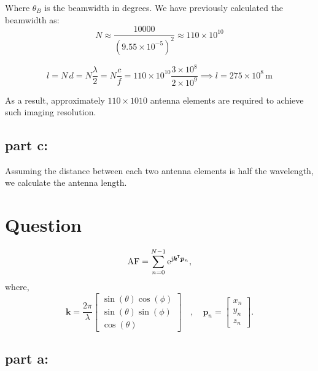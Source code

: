 \documentclass[12pt,onecolumn,a4paper]{article}
\newcommand*{\transpose}{{\mkern-1.5mu\mathsf{T}}}
\newcommand\question{
	\section{Question \numberstringnum{\thesection}}
}
\begin{document}
	Where $\theta_B$ is the beamwidth in degrees. We have previously calculated the beamwidth as:
	\begin{equation}
		N \approx \frac{10000}{(9.55 \times 10^{-5})^2} \approx 110 \times 10^{10}
	\end{equation}
	
	
	\begin{equation}
		l = N \, d = N \frac{\lambda}{2} = N \frac{c}{f} = 110 \times 10^{10} \frac{3 \times 10^8}{2 \times 10^9} \implies l = 275 \times 10^8 \, \text{m}
	\end{equation}
	
	
	As a result, approximately $110 \times 1010$ antenna elements are required to achieve such imaging resolution.
	
	
	\FloatBarrier
	\subsection{part c:}

 Assuming the distance between each two antenna elements is half the wavelength, we calculate the antenna length.
	
	
	
	
	
	
	
	
	\FloatBarrier
	\question%
	
	
	\begin{equation}
		\text{AF} = \sum_{n=0}^{N-1} \mathrm{e}^{\mathrm{j}\bm{k}^\transpose\bm{p}_n},
	\end{equation}
	where,
	\begin{equation}
		\bm{k} =
		\frac{2\pi}{\lambda}
		\begin{bmatrix}
			\sin(\theta)\cos(\phi) \\ 	\sin(\theta)\sin(\phi) \\ \cos(\theta)
		\end{bmatrix}
		\quad,\quad
		\bm{p}_n = 
		\begin{bmatrix}
			x_n \\ y_n \\ z_n
		\end{bmatrix}.
	\end{equation}
	
	\FloatBarrier
	\subsection{part a:}
	
\end{document}
